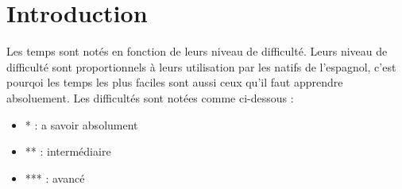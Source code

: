 \chapter*{Introduction}
\noindent Les temps sont notés en fonction de leurs niveau de difficulté. Leurs niveau de difficulté sont proportionnels à leurs utilisation par les natifs de l'espagnol, c'est pourqoi les temps les plus faciles sont aussi ceux qu'il faut apprendre absoluement. \newline
\noindent Les difficultés sont notées comme ci-dessous :
\begin{itemize}
    \item * : a savoir absolument
    \item ** : intermédiaire
    \item *** : avancé
\end{itemize}